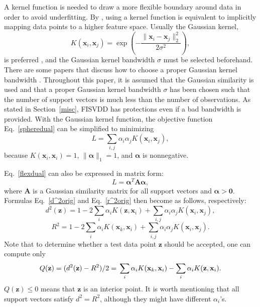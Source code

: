 \documentclass{article}
\newcommand{\eref}[1]{Eq.~\ref{#1}}
\newcommand{\sref}[1]{Section~\ref{#1}}
\numberwithin{equation}{section}
\begin{document}
A kernel function is needed to draw a more flexible boundary around data in order to avoid underfitting. By \citet{tax2004support}, using a kernel function is equivalent to implicitly mapping data points to a higher feature space. Usually the Gaussian kernel,
\begin{equation}\label{gaussian}
K(\mathbf{x}_i,\mathbf{x}_j) = \exp(-\frac{\|\mathbf{x}_i-\mathbf{x}_j\|_2^2}{2\sigma^2}),
\end{equation}
is preferred \citep{ben2001support,laskov2006incremental,gu2015incremental}, and the Gaussian kernel bandwidth $\sigma$ must be selected beforehand. There are some papers that discuss how to choose a proper Gaussian kernel bandwidth \citep{evangelista2007some,xiao2014two,kakde2017peak}. Throughout this paper, it is assumed that the Gaussian similarity is used and that a proper Gaussian kernel bandwidth $\sigma$ has been chosen such that the number of support vectors is much less than the number of observations. As stated in \sref{misc}, FISVDD has protections even if a bad bandwidth is provided. With the Gaussian kernel function, the objective function \eref{spheredual} can be simplified to minimizing
\begin{equation}\label{flexdual}
L=\sum_{i,j}\alpha_{i}\alpha _{j}K(\mathbf{x}_i,\mathbf{x}_j),
\end{equation}
because $K(\mathbf{x}_i,\mathbf{x}_i)=1$, $\|\boldsymbol{\alpha}\|_1=1$, and $\boldsymbol{\alpha}$ is nonnegative.

\eref{flexdual} can also be expressed in matrix form:
\begin{equation}\label{flexmat}
L=\boldsymbol{\alpha}^T\mathbf{A}\boldsymbol{\alpha},
\end{equation}
where $\mathbf{A}$ is a Gaussian similarity matrix for all support vectors and $\boldsymbol{\alpha}>\mathbf{0}$. Formulas \eref{d^2orig} and \eref{r^2orig} then become as follows, respectively:
\begin{equation}\label{d2}
d^2(\mathbf{z}) = 1-2\sum_i\alpha_iK(\mathbf{z},\mathbf{x}_i)+\sum_{i,j}\alpha_i\alpha_jK(\mathbf{x}_i,\mathbf{x}_j),
\end{equation}
\begin{equation}
R^2 = 1-2\sum_i\alpha_iK(\mathbf{x}_k,\mathbf{x}_i)+\sum_{i,j}\alpha_i\alpha_jK(\mathbf{x}_i,\mathbf{x}_j).
\end{equation}
Note that to determine whether a test data point $\mathbf{z}$ should be accepted, one can compute only
\begin{equation}\label{dtb}
Q(\mathbf{z}) = (d^2(\mathbf{z}) - R^2)/2 = \\ 
\sum_i\alpha_iK(\mathbf{x}_k,\mathbf{x}_i) - \sum_i\alpha_iK(\mathbf{z},\mathbf{x}_i).
\end{equation}
$Q(\mathbf{z})\le0$ means that $\mathbf{z}$ is an interior point. It is worth mentioning that all support vectors satisfy $d^2=R^2$, although they might have different $\alpha_i$'s.
\end{document}
